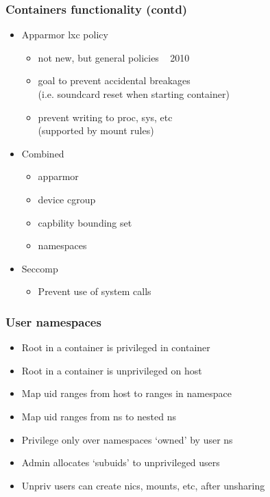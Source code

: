 \documentclass{beamer}
\begin{document}
\begin{frame}
\frametitle{Containers functionality (contd)}
\begin{itemize}
\item Apparmor lxc policy
  \begin{itemize}
  \item not new, but general policies ~ 2010
  \item  goal to prevent accidental breakages \\
  (i.e. soundcard reset when starting container)
  \item prevent writing to proc, sys, etc \\
  (supported by mount rules)
  \end{itemize}
\pause
\item Combined
  \begin{itemize}
  \item apparmor
  \item device cgroup
  \item capbility bounding set
  \item namespaces
  \end{itemize}

\pause
\item Seccomp
  \begin{itemize}
  \item Prevent use of system calls
  \end{itemize}
\end{itemize}

\end{frame}

\begin{frame}
\frametitle{User namespaces}
  \begin{itemize}
  \item Root in a container is privileged in container
  \item Root in a container is unprivileged on host
  \pause
  \item Map uid ranges from host to ranges in namespace
  \item Map uid ranges from ns to nested ns
  \item Privilege only over namespaces `owned' by user ns
  \item Admin allocates `subuids' to unprivileged users
  \item Unpriv users can create nics, mounts, etc, after unsharing
  \end{itemize}
\end{frame}
\end{document}
